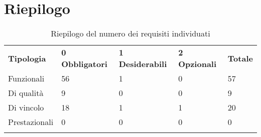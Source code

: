 \documentclass[AnalisiDeiRequisiti.tex]{subfiles}
\begin{document}
\section{Riepilogo}

\label{table:Riepilogo del numero dei requisiti individuati}
\renewcommand*{\arraystretch}{1.2}
\begin{longtable}[H]{p{2.8cm}p{2.9cm}p{2.9cm}p{2.9cm}p{1.5cm}}
	\rowcolor{CHeader}
	\color{CHeaderText} \textbf{Tipologia} & \color{CHeaderText} \textbf{0 Obbligatori} & \color{CHeaderText} \textbf{1 Desiderabili} & \color{CHeaderText} \textbf{2 Opzionali} & \color{CHeaderText} \textbf{Totale} \\
	Funzionali & 56 & 1 & 0 & 57 \\
	Di qualità & 9 & 0 & 0 & 9 \\
	Di vincolo & 18 & 1 & 1 & 20 \\
	Prestazionali & 0 & 0 & 0 & 0 \\
	\hiderowcolors
	\caption{Riepilogo del numero dei requisiti individuati}
\end{longtable}
\end{document}
